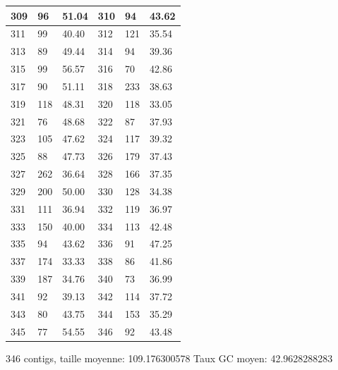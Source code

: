 \documentclass[10.9pt]{article} %
\begin{document}
{\begin{longtable}{|p{2cm}|p{2cm}|p{2cm}|p{2cm}|p{2cm}|p{2cm}|}
\hline
309 & 96& 51.04 & 310 & 94& 43.62\\
\hline
311 & 99& 40.40 & 312 & 121& 35.54\\
\hline
313 & 89& 49.44 & 314 & 94& 39.36\\
\hline
315 & 99& 56.57 & 316 & 70& 42.86\\
\hline
317 & 90& 51.11 & 318 & 233& 38.63\\
\hline
319 & 118& 48.31 & 320 & 118& 33.05\\
\hline
321 & 76& 48.68 & 322 & 87& 37.93\\
\hline
323 & 105& 47.62 & 324 & 117& 39.32\\
\hline
325 & 88& 47.73 & 326 & 179& 37.43\\
\hline
327 & 262& 36.64 & 328 & 166& 37.35\\
\hline
329 & 200& 50.00 & 330 & 128& 34.38\\
\hline
331 & 111& 36.94 & 332 & 119& 36.97\\
\hline
333 & 150& 40.00 & 334 & 113& 42.48\\
\hline
335 & 94& 43.62 & 336 & 91& 47.25\\
\hline
337 & 174& 33.33 & 338 & 86& 41.86\\
\hline
339 & 187& 34.76 & 340 & 73& 36.99\\
\hline
341 & 92& 39.13 & 342 & 114& 37.72\\
\hline
343 & 80& 43.75 & 344 & 153& 35.29\\
\hline
345 & 77& 54.55 & 346 & 92& 43.48\\
\hline
\end{longtable}
}
346 contigs, taille moyenne: 109.176300578 Taux GC moyen: 42.9628288283
\endgroup
\end{document}

